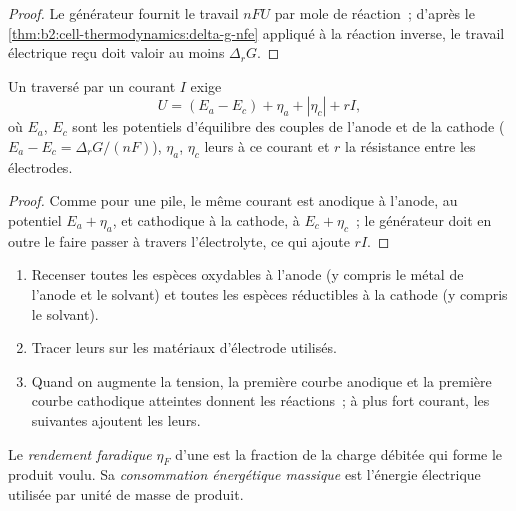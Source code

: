 \begin{proof}
Le générateur fournit le travail $nFU$ par mole de réaction~; d'après le
\cref{thm:b2:cell-thermodynamics:delta-g-nfe} appliqué à la réaction inverse, le
travail électrique reçu doit valoir au moins $\Delta_r G$.
\end{proof}

\begin{proposition}\label{prop:b2:batteries-electrolysis:electrolysis-voltage}
Un  traversé par un courant $I$ exige
\[
  U = (E_a - E_c) + \eta_a + |\eta_c| + rI ,
\]
où $E_a$, $E_c$ sont les potentiels d'équilibre des couples de l'anode et de la cathode
($E_a - E_c = \Delta_r G/(nF)$), $\eta_a$, $\eta_c$ leurs  à ce
courant et $r$ la résistance entre les électrodes.
\end{proposition}

\begin{proof}
Comme pour une pile, le même courant est anodique à l'anode, au potentiel $E_a +
\eta_a$, et cathodique à la cathode, à $E_c + \eta_c$~; le générateur doit en outre
le faire passer à travers l'électrolyte, ce qui ajoute $rI$.
\end{proof}

\begin{method}\label{met:b2:batteries-electrolysis:predict-electrolysis}
\begin{enumerate}
  \item Recenser toutes les espèces oxydables à l'anode (y compris le
        métal de l'anode et le solvant) et toutes les espèces réductibles à
        la cathode (y compris le solvant).
  \item Tracer leurs  sur les matériaux d'électrode utilisés.
  \item Quand on augmente la tension, la première courbe anodique et la première courbe
        cathodique atteintes donnent les réactions~; à plus fort courant, les suivantes ajoutent
        les leurs.
\end{enumerate}
\end{method}

\begin{definition}\label{def:b2:batteries-electrolysis:faradaic-efficiency}
Le \emph{rendement faradique} $\eta_F$ d'une
 est la fraction de la charge débitée qui forme le produit
voulu. Sa \emph{consommation énergétique massique}
est l'énergie électrique utilisée par unité de masse de produit.
\end{definition}

